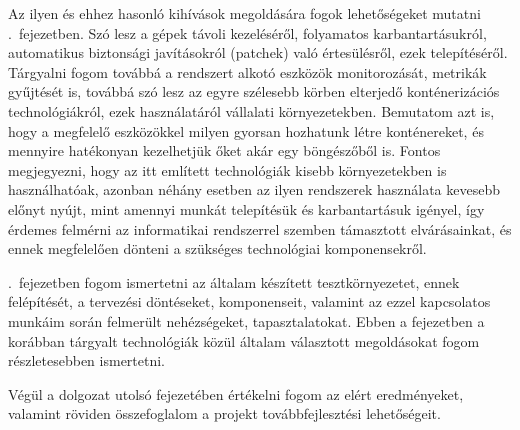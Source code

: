 Az ilyen és ehhez hasonló kihívások megoldására fogok lehetőségeket mutatni .~fejezetben. Szó lesz a gépek távoli kezeléséről, folyamatos karbantartásukról, automatikus biztonsági javításokról (patchek) való értesülésről, ezek telepítéséről. Tárgyalni fogom továbbá a rendszert alkotó eszközök monitorozását, metrikák gyűjtését is, továbbá szó lesz az egyre szélesebb körben elterjedő konténerizációs technológiákról, ezek használatáról vállalati környezetekben. Bemutatom azt is, hogy a megfelelő eszközökkel milyen gyorsan hozhatunk létre konténereket, és mennyire hatékonyan kezelhetjük őket akár egy böngészőből is.
Fontos megjegyezni, hogy az itt említett technológiák kisebb környezetekben is használhatóak, azonban néhány esetben az ilyen rendszerek használata kevesebb előnyt nyújt, mint amennyi munkát telepítésük és karbantartásuk igényel, így érdemes felmérni az informatikai rendszerrel szemben támasztott elvárásainkat, és ennek megfelelően dönteni a szükséges technológiai komponensekről.

.~fejezetben fogom ismertetni az általam készített tesztkörnyezetet, ennek felépítését, a tervezési döntéseket, komponenseit, valamint az ezzel kapcsolatos munkáim során felmerült nehézségeket, tapasztalatokat. Ebben a fejezetben a korábban tárgyalt technológiák közül általam választott megoldásokat fogom részletesebben ismertetni.

Végül a dolgozat utolsó fejezetében értékelni fogom az elért eredményeket, valamint röviden összefoglalom a projekt továbbfejlesztési lehetőségeit.


